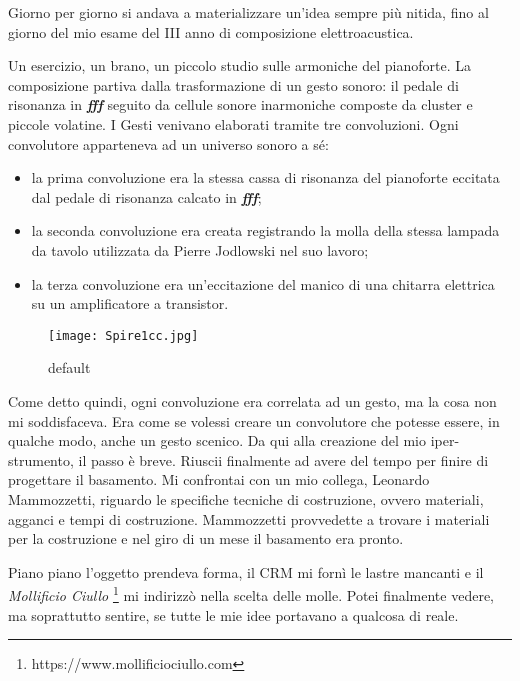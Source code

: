 Giorno per giorno si andava a materializzare un'idea sempre più nitida, fino al giorno del mio esame del III anno di composizione elettroacustica.

Un esercizio, un brano, un piccolo studio sulle armoniche del pianoforte. La composizione partiva dalla trasformazione di un gesto sonoro: il pedale di risonanza in \textit{\textbf{fff}} seguito da cellule sonore inarmoniche composte da cluster e piccole volatine. I Gesti venivano elaborati tramite tre convoluzioni. Ogni convolutore apparteneva ad un universo sonoro a sé:
\begin{itemize}
\item{la prima convoluzione era la stessa cassa di risonanza del pianoforte eccitata dal pedale di risonanza calcato in \textit{\textbf{fff}};}
\item{la seconda convoluzione era creata registrando la molla della stessa lampada da tavolo utilizzata da Pierre Jodlowski nel suo lavoro;}
\item{la terza convoluzione era un'eccitazione del manico di una chitarra elettrica su un amplificatore a transistor.}
\end{itemize}

%

\begin{figure}[htbp]
\begin{center}
\texttt{[image: Spire1cc.jpg]}
\caption{default}
\label{default}
\end{center}
\end{figure}

Come detto quindi, ogni convoluzione era correlata ad un gesto, ma la cosa non mi soddisfaceva. Era come se volessi creare un convolutore che potesse essere, in qualche modo, anche un gesto scenico. Da qui alla creazione del mio iper-strumento, il passo è breve. Riuscii finalmente ad avere del tempo per finire di progettare il basamento. Mi confrontai con un mio collega, Leonardo Mammozzetti, riguardo le specifiche tecniche di costruzione, ovvero materiali, agganci e tempi di costruzione. Mammozzetti provvedette a trovare i materiali per la costruzione e nel giro di un mese il basamento era pronto.

Piano piano l'oggetto prendeva forma, il CRM mi fornì le lastre mancanti e il \textit{Mollificio Ciullo} \footnote{https://www.mollificiociullo.com} mi indirizzò nella scelta delle molle. Potei finalmente vedere, ma soprattutto sentire, se tutte le mie idee portavano a qualcosa di reale.

